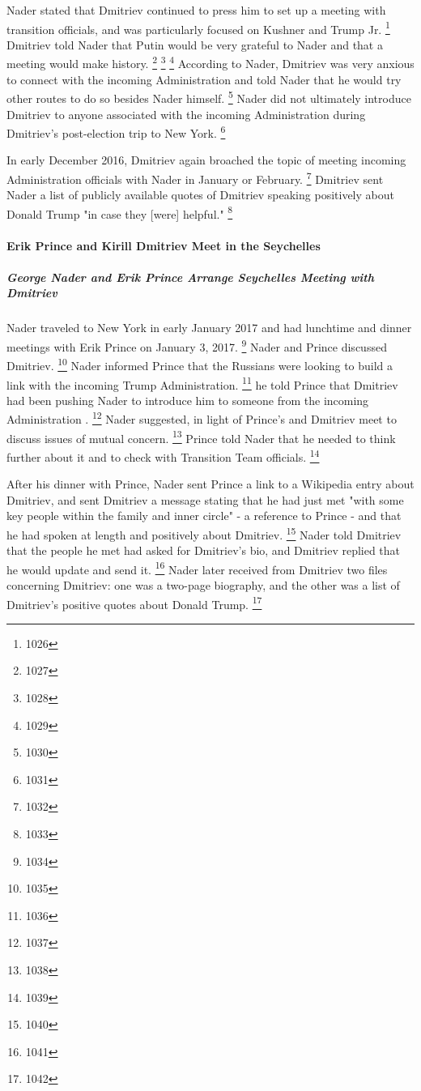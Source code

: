 Nader stated that Dmitriev continued to press him to set up a meeting with transition officials, and was particularly focused on Kushner and Trump Jr.%
\footnote{1026}
Dmitriev told Nader that Putin would be very grateful to Nader and that a meeting would make history.%
\footnote{1027}
\footnote{1028}
\footnote{1029}
According to Nader, Dmitriev was very anxious to connect with the incoming Administration and told Nader that he would try other routes to do so besides Nader himself.%
\footnote{1030}
Nader did not ultimately introduce Dmitriev to anyone associated with the incoming Administration during Dmitriev's post-election trip to New York.%
\footnote{1031}

In early December 2016, Dmitriev again broached the topic of meeting incoming Administration officials with Nader in January or February.%
\footnote{1032}
Dmitriev sent Nader a list of publicly available quotes of Dmitriev speaking positively about Donald Trump "in case they [were] helpful."%
\footnote{1033}

\paragraph{Erik Prince and Kirill Dmitriev Meet in the Seychelles}

\subparagraph{George Nader and Erik Prince Arrange Seychelles Meeting with Dmitriev}

Nader traveled to New York in early January 2017 and had lunchtime and dinner meetings with Erik Prince on January 3, 2017.%
\footnote{1034}
Nader and Prince discussed Dmitriev.%
\footnote{1035}
Nader informed Prince that the Russians were looking to build a link with the incoming Trump Administration.%
\footnote{1036}
he told Prince that Dmitriev had been pushing Nader to introduce him to someone from the incoming Administration
.%
\footnote{1037}
Nader suggested, in light of Prince's and Dmitriev meet to discuss issues of mutual concern.%
\footnote{1038}
Prince told Nader that he needed to think further about it and to check with Transition Team officials.%
\footnote{1039}

After his dinner with Prince, Nader sent Prince a link to a Wikipedia entry about Dmitriev, and sent Dmitriev a message stating that he had just met "with some key people within the family and inner circle" - a reference to Prince - and that he had spoken at length and positively about Dmitriev.%
\footnote{1040}
Nader told Dmitriev that the people he met had asked for Dmitriev's bio, and Dmitriev replied that he would update and send it.%
\footnote{1041}
Nader later received from Dmitriev two files concerning Dmitriev: one was a two-page biography, and the other was a list of Dmitriev's positive quotes about Donald Trump.%
\footnote{1042}

